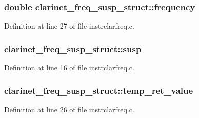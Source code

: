 \subsubsection[{\texorpdfstring{frequency}{frequency}}]{\setlength{\rightskip}{0pt plus 5cm}double clarinet\+\_\+freq\+\_\+susp\+\_\+struct\+::frequency}\hypertarget{structclarinet__freq__susp__struct_a20b7ea665b5a06815249478eab914ba6}{}\label{structclarinet__freq__susp__struct_a20b7ea665b5a06815249478eab914ba6}


Definition at line 27 of file instrclarfreq.\+c.

\subsubsection[{\texorpdfstring{susp}{susp}}]{ clarinet\+\_\+freq\+\_\+susp\+\_\+struct\+::susp}\hypertarget{structclarinet__freq__susp__struct_ac06f86207e751f56459f6bd45295ed2f}{}\label{structclarinet__freq__susp__struct_ac06f86207e751f56459f6bd45295ed2f}


Definition at line 16 of file instrclarfreq.\+c.

\subsubsection[{\texorpdfstring{temp\+\_\+ret\+\_\+value}{temp_ret_value}}]{ clarinet\+\_\+freq\+\_\+susp\+\_\+struct\+::temp\+\_\+ret\+\_\+value}\hypertarget{structclarinet__freq__susp__struct_aabff09b8193ed502f1f8665bf4179a37}{}\label{structclarinet__freq__susp__struct_aabff09b8193ed502f1f8665bf4179a37}


Definition at line 26 of file instrclarfreq.\+c.

